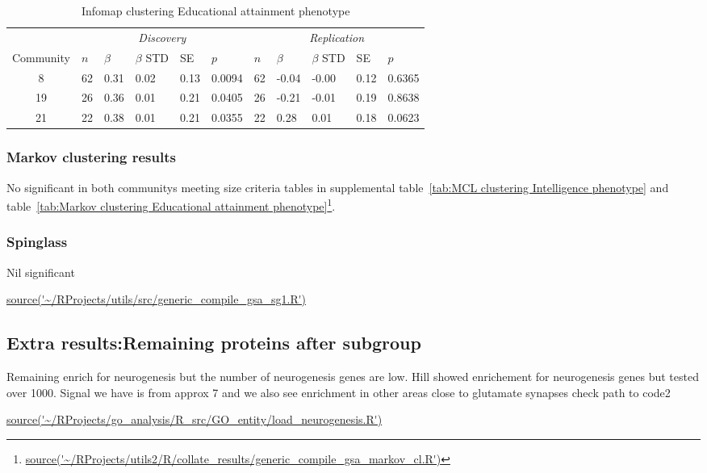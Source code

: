 \begin{table}[ht]
\centering
\setlength{\extrarowheight}{2pt}
\begin{tabular}{cllllllllll}
  \toprule
   &  \multicolumn{5}{c}{\textit{Discovery}} & \multicolumn{5}{c}{\textit{Replication}} \\
    \cmidrule{2-11}
Community & $n$ & $\beta$ & $\beta$ STD & SE & $p$ & $n$ & $\beta$ & $\beta$ STD & SE & $p$\\ 
  \midrule
8 & 62 & 0.31 & 0.02 & 0.13 & 0.0094 & 62 & -0.04 & -0.00 & 0.12 & 0.6365 \\ 
  19 & 26 & 0.36 & 0.01 & 0.21 & 0.0405 & 26 & -0.21 & -0.01 & 0.19 & 0.8638 \\ 
  21 & 22 & 0.38 & 0.01 & 0.21 & 0.0355 & 22 & 0.28 & 0.01 & 0.18 & 0.0623 \\ 
   \bottomrule
\end{tabular}
\caption{Infomap clustering Educational attainment phenotype} 
\label{tab:Infomap clustering Educational attainment phenotype}
\end{table}
\subsubsection{Markov clustering results}


No significant in both communitys meeting size criteria tables in supplemental table~\ref{tab:MCL clustering Intelligence phenotype} and table~\ref{tab:Markov clustering Educational attainment phenotype}\footnote{\tiny \url{source('~/RProjects/utils2/R/collate_results/generic_compile_gsa_markov_cl.R')}}.

\subsubsection{Spinglass}
Nil significant

\url{source('~/RProjects/utils/src/generic_compile_gsa_sg1.R')}


\subsection{Extra results:Remaining proteins after subgroup}
Remaining enrich for neurogenesis but the number of neurogenesis genes are low. Hill showed enrichement for neurogenesis genes but tested over 1000. Signal we have is from approx 7 and we also see enrichment in other areas close to glutamate synapses
check path to code2

\url{source('~/RProjects/go_analysis/R_src/GO_entity/load_neurogenesis.R')}

